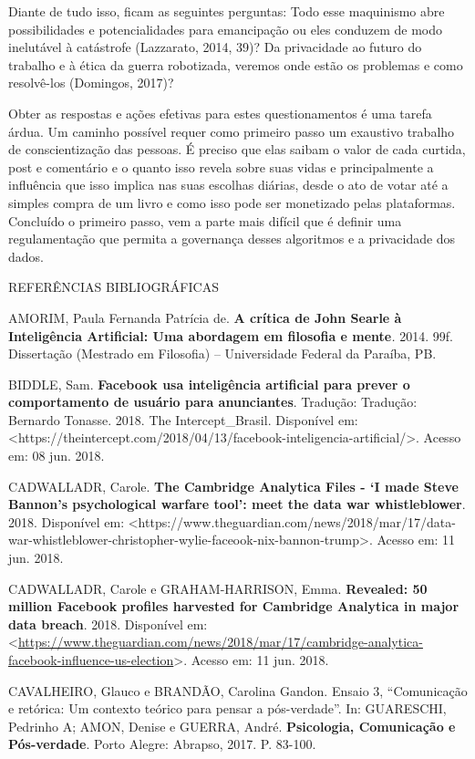 Diante de tudo isso, ficam as seguintes perguntas: Todo esse maquinismo
abre possibilidades e potencialidades para emancipação ou eles conduzem
de modo inelutável à catástrofe (Lazzarato, 2014, 39)? Da privacidade ao
futuro do trabalho e à ética da guerra robotizada, veremos onde estão os
problemas e como resolvê-los (Domingos, 2017)?

Obter as respostas e ações efetivas para estes questionamentos é uma
tarefa árdua. Um caminho possível requer como primeiro passo um
exaustivo trabalho de conscientização das pessoas. É preciso que elas
saibam o valor de cada curtida, post e comentário e o quanto isso revela
sobre suas vidas e principalmente a influência que isso implica nas suas
escolhas diárias, desde o ato de votar até a simples compra de um livro
e como isso pode ser monetizado pelas plataformas. Concluído o primeiro
passo, vem a parte mais difícil que é definir uma regulamentação que
permita a governança desses algoritmos e a privacidade dos dados.

\protect\hypertarget{_Toc520800103}{}{}REFERÊNCIAS BIBLIOGRÁFICAS

AMORIM, Paula Fernanda Patrícia de. \textbf{A crítica de John Searle à
Inteligência Artificial: Uma abordagem em filosofia e mente}\emph{.}
2014. 99f. Dissertação (Mestrado em Filosofia) -- Universidade Federal
da Paraíba, PB.

BIDDLE, Sam. \textbf{Facebook usa inteligência artificial para prever o
comportamento de usuário para anunciantes}. Tradução: Tradução: Bernardo
Tonasse. 2018. The Intercept\_Brasil. Disponível em:
\textless{}https://theintercept.com/2018/04/13/facebook-inteligencia-artificial/\textgreater{}.
Acesso em: 08 jun. 2018.

CADWALLADR, Carole. \textbf{The Cambridge Analytica Files - `I made
Steve Bannon's psychological warfare tool': meet the data war
whistleblower}. 2018. Disponível em:
\textless{}https://www.theguardian.com/news/2018/mar/17/data-war-whistleblower-christopher-wylie-faceook-nix-bannon-trump\textgreater{}.
Acesso em: 11 jun. 2018.

CADWALLADR, Carole e GRAHAM-HARRISON, Emma. \textbf{Revealed: 50 million
Facebook profiles harvested for Cambridge Analytica in major data
breach}. 2018. Disponível em:
\textless{}\url{https://www.theguardian.com/news/2018/mar/17/cambridge-analytica-facebook-influence-us-election}\textgreater{}.
Acesso em: 11 jun. 2018.

CAVALHEIRO, Glauco e BRANDÃO, Carolina Gandon. Ensaio 3, ``Comunicação e
retórica: Um contexto teórico para pensar a pós-verdade''. In:
GUARESCHI, Pedrinho A; AMON, Denise e GUERRA, André. \textbf{Psicologia,
Comunicação e Pós-verdade}. Porto Alegre: Abrapso, 2017. P. 83-100.

